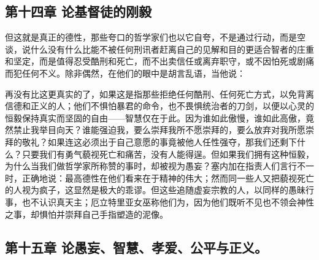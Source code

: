 
\subsection{第十四章 论基督徒的刚毅}

但这就是真正的德性，那些夸口的哲学家们也以它自夸，不是通过行动，而是空谈，说什么没有什么比能不被任何刑讯者赶离自己的见解和目的更适合智者的庄重和坚定，而是值得忍受酷刑和死亡，而不出卖信任或离弃职守，或不因怕死或剧痛而犯任何不义。除非偶然，在他们的眼中是胡言乱语，当他说：\par

\par

再没有比这更真实的了，如果这是指那些拒绝任何酷刑、任何死亡方式，以免背离信德和正义的人；他们不惧怕暴君的命令，也不畏惧统治者的刀剑，以便以心灵的恒毅保持真实而坚固的自由——智慧仅在于此。因为谁如此傲慢，谁如此高傲，竟然禁止我举目向天？谁能强迫我，要么崇拜我所不愿崇拜的，要么放弃对我所愿崇拜的敬礼？如果连这必须出于自己意愿的事竟被他人任性强夺，那我们还剩下什么？只要我们有勇气藐视死亡和痛苦，没有人能得逞。但如果我们拥有这种恒毅，为什么当我们做哲学家所称赞的事时，却被视为愚妄？塞内加在指责人们言行不一时，正确地说：最高德性在他们看来在于精神的伟大；然而同一些人又把藐视死亡的人视为疯子，这显然是极大的乖谬。但这些追随虚妄宗教的人，以同样的愚昧行事，也不认识真天主；厄立特里亚女巫称他们为，因为他们既听不见也不领会神性之事，却惧怕并崇拜自己手指塑造的泥像。\par


\subsection{第十五章  论愚妄、智慧、孝爱、公平与正义。}

